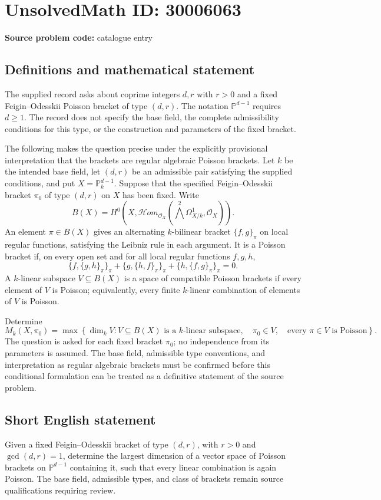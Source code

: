 \documentclass[11pt]{article}
\begin{document}
\section*{UnsolvedMath ID: 30006063}
\textbf{Source problem code:} catalogue entry
\subsection{Definitions and mathematical statement}
The supplied record asks about coprime integers \(d,r\) with \(r>0\) and a fixed Feigin--Odesskii Poisson bracket of type \((d,r)\). The notation \(\mathbb P^{d-1}\) requires \(d\geq 1\). The record does not specify the base field, the complete admissibility conditions for this type, or the construction and parameters of the fixed bracket.

The following makes the question precise under the explicitly provisional interpretation that the brackets are regular algebraic Poisson brackets. Let \(k\) be the intended base field, let \((d,r)\) be an admissible pair satisfying the supplied conditions, and put \(X=\mathbb P^{d-1}_k\). Suppose that the specified Feigin--Odesskii bracket \(\pi_0\) of type \((d,r)\) on \(X\) has been fixed. Write
\[
 B(X)=H^0\!\left(X,\mathcal Hom_{\mathcal O_X}\!\left(\bigwedge^2\Omega^1_{X/k},\mathcal O_X\right)\right).
\]
An element \(\pi\in B(X)\) gives an alternating \(k\)-bilinear bracket \(\{f,g\}_{\pi}\) on local regular functions, satisfying the Leibniz rule in each argument. It is a Poisson bracket if, on every open set and for all local regular functions \(f,g,h\),
\[
 \{f,\{g,h\}_{\pi}\}_{\pi}
 +\{g,\{h,f\}_{\pi}\}_{\pi}
 +\{h,\{f,g\}_{\pi}\}_{\pi}=0.
\]
A \(k\)-linear subspace \(V\subseteq B(X)\) is a space of compatible Poisson brackets if every element of \(V\) is Poisson; equivalently, every finite \(k\)-linear combination of elements of \(V\) is Poisson.

Determine
\[
 M_k(X,\pi_0)=\max\left\{\dim_k V:
 V\subseteq B(X)\text{ is a }k\text{-linear subspace},\quad
 \pi_0\in V,\quad
 \text{every }\pi\in V\text{ is Poisson}\right\}.
\]
The question is asked for each fixed bracket \(\pi_0\); no independence from its parameters is assumed. The base field, admissible type conventions, and interpretation as regular algebraic brackets must be confirmed before this conditional formulation can be treated as a definitive statement of the source problem.
\subsection{Short English statement}
Given a fixed Feigin--Odesskii bracket of type \((d,r)\), with \(r>0\) and \(\gcd(d,r)=1\), determine the largest dimension of a vector space of Poisson brackets on \(\mathbb P^{d-1}\) containing it, such that every linear combination is again Poisson. The base field, admissible types, and class of brackets remain source qualifications requiring review.
\end{document}
